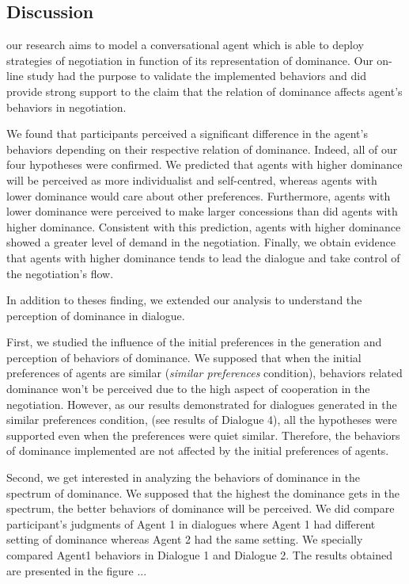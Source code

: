 \documentclass{llncs}
\begin{document}
			 \subsection{Discussion}

			 our research aims to model a conversational agent which is able to deploy strategies of negotiation in function of its representation of dominance. Our on-line study had the purpose to validate the implemented behaviors and did provide strong support to the claim that the relation of dominance affects agent's behaviors in negotiation.
			 
			 We found that participants perceived a significant difference in the agent's behaviors depending on their respective relation of dominance.  
			 Indeed, all of our four hypotheses were confirmed. We predicted that agents with higher dominance will be perceived as more individualist and self-centred, whereas agents with lower dominance would care about other preferences. Furthermore, agents with lower dominance were perceived to make larger concessions than did agents with higher dominance. Consistent with this prediction, agents with higher dominance showed a greater level of demand in the negotiation. Finally, we obtain evidence that agents with higher dominance tends to lead the dialogue and take control of the negotiation's flow. 
			 
			 In addition to theses finding, we extended our analysis to understand the perception of dominance in dialogue.
			
			 First, we studied the influence of the initial preferences in the generation and perception of behaviors of dominance.
			 We supposed that when the initial preferences of agents are similar (\textit{similar preferences} condition), behaviors related dominance won't be perceived due to the high aspect of cooperation in the negotiation. However, as our results demonstrated for dialogues generated in the similar preferences condition, (see results of Dialogue 4), all the hypotheses were supported even when the preferences were quiet similar. Therefore, the behaviors of dominance implemented are not affected by the initial preferences of agents.
			 
			 Second, we get interested in analyzing the behaviors of dominance in the spectrum of dominance. We supposed that the highest the dominance gets in the spectrum, the better behaviors of dominance will be perceived. We did compare participant's judgments of Agent 1 in dialogues where Agent 1 had different setting of dominance whereas Agent 2 had the same setting. We specially compared Agent1 behaviors in Dialogue 1 and Dialogue 2. The results obtained are presented in the figure ... 
			 
\end{document}
